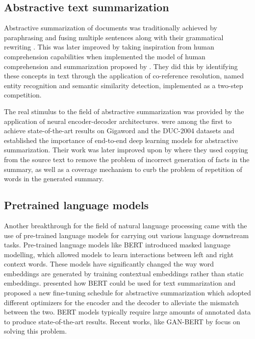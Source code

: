 \documentclass[11pt,a4paper]{article}
\begin{document}
\subsection{Abstractive text summarization}
Abstractive summarization of documents was traditionally achieved by paraphrasing and fusing multiple sentences along with their grammatical rewriting \cite{woodsend2012multiple}. This was later improved by taking inspiration from human comprehension capabilities when \citet*{fang2014summariser} implemented the model of human comprehension and summarization proposed by \citet*{kintsch1978toward}. They did this by identifying these concepts in text through the application of co-reference resolution, named entity recognition and semantic similarity detection, implemented as a two-step competition.

The real stimulus to the field of abstractive summarization was provided by the application of neural encoder-decoder architectures. \citet{rush2015neural} were among the first to achieve state-of-the-art results on Gigaword \cite{graff2003english} and the DUC-2004 \cite{over2007duc} datasets and established the importance of end-to-end deep learning models for abstractive summarization. Their work was later improved upon by \citet{see2017get} where they used copying from the source text to remove the problem of incorrect generation of facts in the summary, as well as a coverage mechanism to curb the problem of repetition of words in the generated summary.

\subsection{Pretrained language models}
Another breakthrough for the field of natural language processing came with the use of pre-trained language models for carrying out various language downstream tasks. Pre-trained language models like BERT \cite{devlin2018bert} introduced masked language modelling, which allowed models to learn interactions between left and right context words. These models have significantly changed the way word embeddings are generated by training contextual embeddings rather than static embeddings. \citet{liu2019text} presented how BERT could be used for text summarization and proposed a new fine-tuning schedule for abstractive summarization which adopted different optimizers for the encoder and the decoder to alleviate the mismatch between the two. BERT models typically require large amounts of annotated data to produce state-of-the-art results. Recent works, like GAN-BERT by \citet{croce2020gan} focus on solving this problem.
\end{document}
